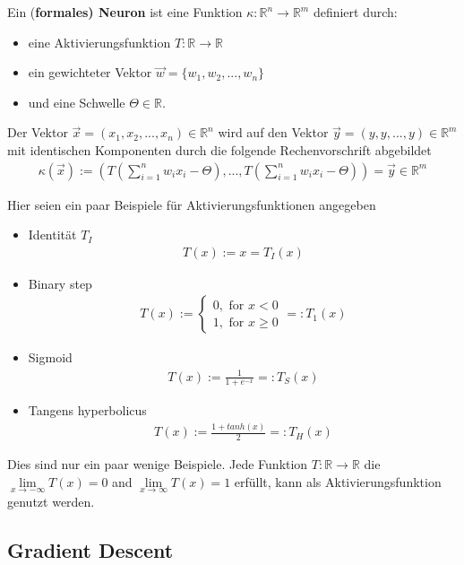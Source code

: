 \begin{definition}
\cite[Kapitel 1.2]{BL1997} Ein (\textbf{formales) Neuron} ist eine Funktion $\kappa: \mathbb{R}^n \rightarrow \mathbb{R}^m$ definiert durch:
\begin{itemize}
\item eine Aktivierungsfunktion $T:\mathbb{R} \rightarrow \mathbb{R}$
\item ein gewichteter Vektor $\vec{w} = \{w_1,w_2,...,w_n\}$
\item und eine Schwelle  $\Theta\in\mathbb{R}$.
\end{itemize}
Der Vektor $\vec{x} = (x_1,x_2,...,x_n)\in \mathbb{R}^n$ wird auf den Vektor $\vec{y} = (y,y,...,y)\in \mathbb{R}^m$ mit identischen Komponenten durch die folgende Rechenvorschrift abgebildet
\begin{align}
\kappa(\vec{x}):= (T(\sum\limits_{i=1}^n w_i x_i - \Theta),...,T(\sum\limits_{i=1}^n w_i x_i - \Theta))=\vec{y} \in \mathbb{R}^m
\end{align}   
\end{definition}
Hier seien ein paar Beispiele für Aktivierungsfunktionen angegeben
\begin{itemize}
\item Identität $T_I$
\begin{align*}
T(x):=x=T_I(x)
\end{align*}
\item Binary step
\begin{align*}
T(x) := \begin{cases} 0, \text{ for } x < 0 \\ 1, \text{ for } x \geq 0 \end{cases} =: T_1 (x)
\end{align*}
\item Sigmoid
\begin{align*}
T(x) := \frac{1}{1+e^{-x}} =: T_S(x)
\end{align*}
\item Tangens hyperbolicus
\begin{align*}
T(x) := \frac{1+tanh(x)}{2} =: T_H(x)
\end{align*}
\end{itemize}
Dies sind nur ein paar wenige Beispiele. Jede Funktion $T:\mathbb{R}\rightarrow \mathbb{R}$ die $\lim\limits_{x \rightarrow -\infty}{T(x)}=0$ and $\lim\limits_{x \rightarrow \infty}{T(x)}=1$ erfüllt, kann als Aktivierungsfunktion genutzt werden.

\subsection{Gradient Descent}\label{Gradient Descent}

